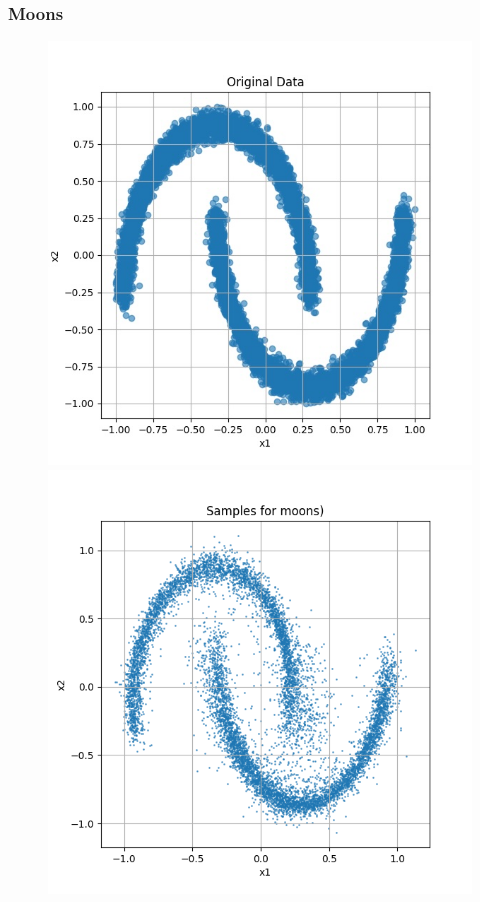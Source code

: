 \documentclass[a4paper,12pt]{article}
\begin{document}
\subsubsection*{Moons}

\begin{figure}[H]
  \centering
  \begin{minipage}{0.3\textwidth}
      \centering
      \includegraphics[width=\linewidth]{images/moon.jpg}
  \end{minipage}
  \begin{minipage}{0.3\textwidth}
      \centering
      \includegraphics[width=\linewidth]{"images/Samples for ddpm_2_200_0.0001_0.02_moons_linear.png"}

\end{minipage}
\end{figure}
\end{document}
